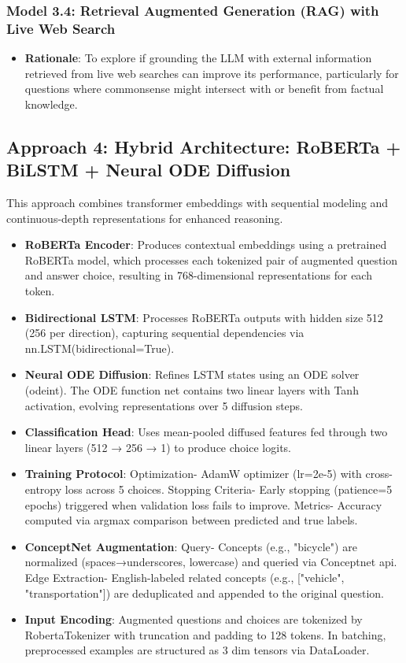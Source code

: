 \documentclass[10.5pt]{article}
\begin{document}
\subsubsection{Model 3.4: Retrieval Augmented Generation (RAG) with Live Web Search}
\begin{itemize}
    \item \textbf{Rationale}: To explore if grounding the LLM with external information retrieved from live web searches can improve its performance, particularly for questions where commonsense might intersect with or benefit from factual knowledge.
\end{itemize}

\subsection{Approach 4: Hybrid Architecture: RoBERTa + BiLSTM + Neural ODE Diffusion}
This approach combines transformer embeddings with sequential modeling and continuous-depth representations for enhanced reasoning. 
\begin{itemize}
    \item \textbf{RoBERTa Encoder}: Produces contextual embeddings using a pretrained RoBERTa model, which processes each tokenized pair of augmented question and answer choice, resulting in 768-dimensional representations for each token.
    
    \item \textbf{Bidirectional LSTM}: Processes RoBERTa outputs with hidden size 512 (256 per direction), capturing sequential dependencies via nn.LSTM(bidirectional=True).
    
    \item \textbf{Neural ODE Diffusion}: Refines LSTM states using an ODE solver (odeint). The ODE function net contains two linear layers with Tanh activation, evolving representations over 5 diffusion steps.
    \item \textbf{Classification Head}: Uses mean-pooled diffused features fed through two linear layers (512 → 256 → 1) to produce choice logits.

    \item \textbf{Training Protocol}: Optimization- AdamW optimizer (lr=2e-5) with cross-entropy loss across 5 choices. Stopping Criteria- Early stopping (patience=5 epochs) triggered when validation loss fails to improve. Metrics- Accuracy computed via argmax comparison between predicted and true labels.

    \item \textbf{ConceptNet Augmentation}: Query- Concepts (e.g., "bicycle") are normalized (spaces→underscores, lowercase) and queried via Conceptnet api. Edge Extraction- English-labeled related concepts (e.g., ["vehicle", "transportation"]) are deduplicated and appended to the original question.

    \item \textbf{Input Encoding}: Augmented questions and choices are tokenized by RobertaTokenizer with truncation and padding to 128 tokens. In batching, preprocessed examples are structured as 3 dim tensors via DataLoader.

\end{itemize}
\end{document}
